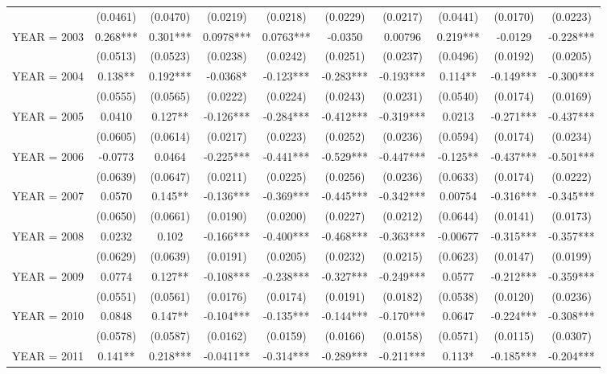 \begin{tabular}{lccccccccc}
 & (0.0461) & (0.0470) & (0.0219) & (0.0218) & (0.0229) & (0.0217) & (0.0441) & (0.0170) & (0.0223) \\
YEAR = 2003 & 0.268*** & 0.301*** & 0.0978*** & 0.0763*** & -0.0350 & 0.00796 & 0.219*** & -0.0129 & -0.228*** \\
 & (0.0513) & (0.0523) & (0.0238) & (0.0242) & (0.0251) & (0.0237) & (0.0496) & (0.0192) & (0.0205) \\
YEAR = 2004 & 0.138** & 0.192*** & -0.0368* & -0.123*** & -0.283*** & -0.193*** & 0.114** & -0.149*** & -0.300*** \\
 & (0.0555) & (0.0565) & (0.0222) & (0.0224) & (0.0243) & (0.0231) & (0.0540) & (0.0174) & (0.0169) \\
YEAR = 2005 & 0.0410 & 0.127** & -0.126*** & -0.284*** & -0.412*** & -0.319*** & 0.0213 & -0.271*** & -0.437*** \\
 & (0.0605) & (0.0614) & (0.0217) & (0.0223) & (0.0252) & (0.0236) & (0.0594) & (0.0174) & (0.0234) \\
YEAR = 2006 & -0.0773 & 0.0464 & -0.225*** & -0.441*** & -0.529*** & -0.447*** & -0.125** & -0.437*** & -0.501*** \\
 & (0.0639) & (0.0647) & (0.0211) & (0.0225) & (0.0256) & (0.0236) & (0.0633) & (0.0174) & (0.0222) \\
YEAR = 2007 & 0.0570 & 0.145** & -0.136*** & -0.369*** & -0.445*** & -0.342*** & 0.00754 & -0.316*** & -0.345*** \\
 & (0.0650) & (0.0661) & (0.0190) & (0.0200) & (0.0227) & (0.0212) & (0.0644) & (0.0141) & (0.0173) \\
YEAR = 2008 & 0.0232 & 0.102 & -0.166*** & -0.400*** & -0.468*** & -0.363*** & -0.00677 & -0.315*** & -0.357*** \\
 & (0.0629) & (0.0639) & (0.0191) & (0.0205) & (0.0232) & (0.0215) & (0.0623) & (0.0147) & (0.0199) \\
YEAR = 2009 & 0.0774 & 0.127** & -0.108*** & -0.238*** & -0.327*** & -0.249*** & 0.0577 & -0.212*** & -0.359*** \\
 & (0.0551) & (0.0561) & (0.0176) & (0.0174) & (0.0191) & (0.0182) & (0.0538) & (0.0120) & (0.0236) \\
YEAR = 2010 & 0.0848 & 0.147** & -0.104*** & -0.135*** & -0.144*** & -0.170*** & 0.0647 & -0.224*** & -0.308*** \\
 & (0.0578) & (0.0587) & (0.0162) & (0.0159) & (0.0166) & (0.0158) & (0.0571) & (0.0115) & (0.0307) \\
YEAR = 2011 & 0.141** & 0.218*** & -0.0411** & -0.314*** & -0.289*** & -0.211*** & 0.113* & -0.185*** & -0.204*** \\

\end{tabular}
